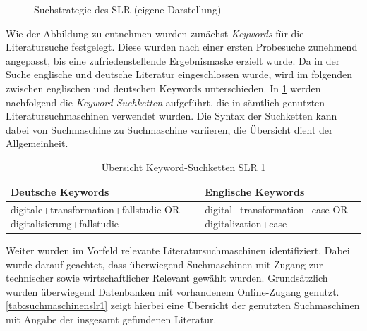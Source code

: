 \begin{figure}[H]
	\centering
	\caption[Suchstrategie des SLR]{Suchstrategie des SLR (eigene Darstellung)}
	\label{fig:suchstrategie}
\end{figure}

Wie der Abbildung zu entnehmen wurden zunächst \textit{Keywords} für die  Literatursuche festgelegt. Diese wurden nach einer ersten Probesuche zunehmend angepasst, bis eine zufriedenstellende Ergebnismaske erzielt wurde. Da in der Suche englische  und deutsche Literatur eingeschlossen wurde, wird im folgenden zwischen englischen und deutschen Keywords unterschieden. In \ref{tab:keywordsslr1} werden nachfolgend die \textit{Keyword-Suchketten} aufgeführt, die in sämtlich genutzten Literatursuchmaschinen verwendet wurden. Die Syntax der Suchketten kann dabei  von Suchmaschine zu  Suchmaschine variieren, die Übersicht dient der Allgemeinheit.

\begin{table}[ht]
	\centering
	\caption{Übersicht Keyword-Suchketten SLR 1}
	\begin{tabular}{|p{7cm}|p{7cm}|}
		\hline
		\textbf{Deutsche Keywords}& \textbf{Englische Keywords} \\
		\hline
		digitale+transformation+fallstudie OR digitalisierung+fallstudie   & digital+transformation+case OR digitalization+case \\
		\hline
	\end{tabular}
	\label{tab:keywordsslr1}
\end{table}

Weiter wurden im Vorfeld relevante Literatursuchmaschinen identifiziert. Dabei wurde darauf geachtet, dass überwiegend Suchmaschinen mit Zugang zur technischer sowie wirtschaftlicher Relevant gewählt wurden. Grundsätzlich wurden überwiegend Datenbanken mit vorhandenem Online-Zugang genutzt.  \ref{tab:suchmaschinenslr1} zeigt hierbei  eine Übersicht der genutzten Suchmaschinen mit Angabe der insgesamt gefundenen Literatur.

